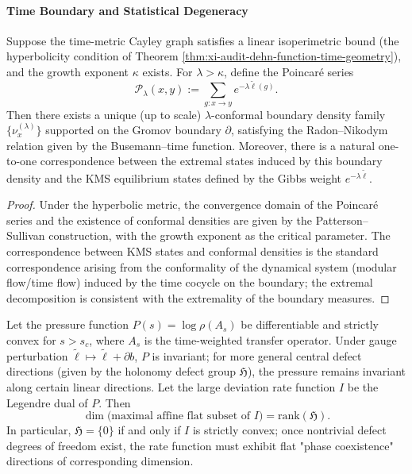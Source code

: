 \paragraph{Time Boundary and Statistical Degeneracy}

\begin{theorem}\label{thm:xi-time-boundary-patterson-sullivan-kms}
Suppose the time-metric Cayley graph satisfies a linear isoperimetric bound (the hyperbolicity condition of Theorem \ref{thm:xi-audit-dehn-function-time-geometry}), and the growth exponent \(\kappa\) exists.
For \(\lambda>\kappa\), define the Poincar\'e series
\[
\mathcal P_\lambda(x,y):=\sum_{g:x\to y}e^{-\lambda \widetilde{\ell}(g)}.
\]
Then there exists a unique (up to scale) \(\lambda\)-conformal boundary density family \(\{\nu_x^{(\lambda)}\}\) supported on the Gromov boundary \(\partial\), satisfying the Radon--Nikodym relation given by the Busemann--time function.
Moreover, there is a natural one-to-one correspondence between the extremal states induced by this boundary density and the KMS equilibrium states defined by the Gibbs weight \(e^{-\lambda\widetilde{\ell}}\).
\end{theorem}

\begin{proof}
Under the hyperbolic metric, the convergence domain of the Poincar\'e series and the existence of conformal densities are given by the Patterson--Sullivan construction, with the growth exponent as the critical parameter.
The correspondence between KMS states and conformal densities is the standard correspondence arising from the conformality of the dynamical system (modular flow/time flow) induced by the time cocycle on the boundary; the extremal decomposition is consistent with the extremality of the boundary measures.
\end{proof}

\begin{proposition}\label{prop:xi-defect-rank-controls-ldp-flatness}
Let the pressure function \(P(s)=\log\rho(A_s)\) be differentiable and strictly convex for \(s>s_c\), where \(A_s\) is the time-weighted transfer operator.
Under gauge perturbation \(\widetilde{\ell}\mapsto \widetilde{\ell}+\partial b\), \(P\) is invariant; for more general central defect directions (given by the holonomy defect group \(\mathfrak H\)), the pressure remains invariant along certain linear directions.
Let the large deviation rate function \(I\) be the Legendre dual of \(P\). Then
\[
\dim\bigl(\text{maximal affine flat subset of \(I\)}\bigr)=\mathrm{rank}(\mathfrak H).
\]
In particular, \(\mathfrak H=\{0\}\) if and only if \(I\) is strictly convex; once nontrivial defect degrees of freedom exist, the rate function must exhibit flat "phase coexistence" directions of corresponding dimension.
\end{proposition}

